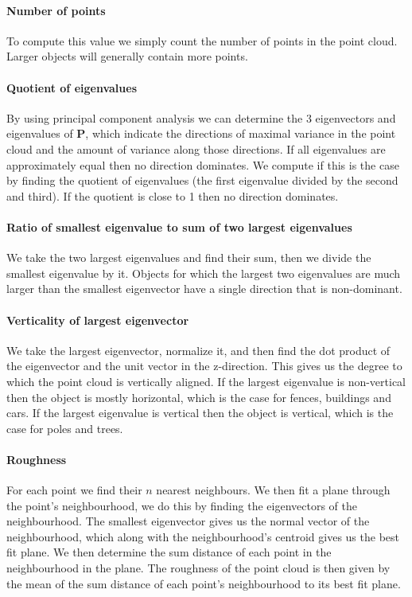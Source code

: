 \paragraph{Number of points} 
To compute this value we simply count the number of points in the point cloud. Larger objects will generally contain more points.

\paragraph{Quotient of eigenvalues} 
By using principal component analysis we can determine the 3 eigenvectors and eigenvalues of \(\mathbf{P}\), which indicate the directions of maximal variance in the point cloud and the amount of variance along those directions. If all eigenvalues are approximately equal then no direction dominates. We compute if this is the case by finding the quotient of eigenvalues (the first eigenvalue divided by the second and third). If the quotient is close to 1 then no direction dominates.

\paragraph{Ratio of smallest eigenvalue to sum of two largest eigenvalues} 
We take the two largest eigenvalues and find their sum, then we divide the smallest eigenvalue by it. Objects for which the largest two eigenvalues are much larger than the smallest eigenvector have a single direction that is non-dominant.

\paragraph{Verticality of largest eigenvector} 
We take the largest eigenvector, normalize it, and then find the dot product of the eigenvector and the unit vector in the z-direction. This gives us the degree to which the point cloud is vertically aligned. If the largest eigenvalue is non-vertical then the object is mostly horizontal, which is the case for fences, buildings and cars. If the largest eigenvalue is vertical then the object is vertical, which is the case for poles and trees.

\paragraph{Roughness}
For each point we find their \(n\) nearest neighbours. We then fit a plane through the point's neighbourhood, we do this by finding the eigenvectors of the neighbourhood. The smallest eigenvector gives us the normal vector of the neighbourhood, which along with the neighbourhood's centroid gives us the best fit plane. We then determine the sum distance of each point in the neighbourhood in the plane. The roughness of the point cloud is then given by the mean of the sum distance of each point's neighbourhood to its best fit plane. 

